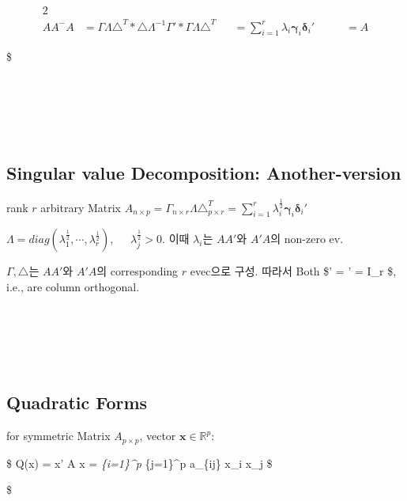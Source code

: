 \documentclass[
]{book}
\begin{document}
{{{\begin{alignat}{2}
\\

AA^- A &= \Gamma \Lambda \triangle^T \ast \triangle \Lambda^{-1}  \Gamma' \ast \Gamma \Lambda \triangle^T 

&&=\sum_{i=1}^r \lambda_i \pmb \gamma_i \pmb \delta_i ' \; \; \; \; \;  \; \; \; \; \; = A




\end{alignat}

\$

~\\
~\\
~\\
~\\

\hypertarget{singular-value-decomposition-another-version}{%
\subsection{Singular value Decomposition: Another-version}\label{singular-value-decomposition-another-version}}

rank \(r\) arbitrary Matrix \(A_{n \times p} = \Gamma_{n \times r} \Lambda \triangle^T_{p \times r} =\sum_{i=1}^r \lambda_i^{\tfrac{1}{2}} \pmb \gamma_i \pmb \delta_i '\)

\(\Lambda = diag(\lambda_1^{\tfrac{1}{2}} , \cdots, \lambda_r^{\tfrac{1}{2}}), \; \; \; \; \; \lambda_j^{\tfrac{1}{2}} >0\). 이때 \(\lambda_i\)는 \(AA'\)와 \(A'A\)의 non-zero ev.

\(\Gamma, \triangle\)는 \(AA'\)와 \(A'A\)의 corresponding \(r\) evec으로 구성. 따라서 Both \$\Gamma ' \Gamma = \triangle ' \triangle  = I\_r \$, i.e., are column orthogonal.

~\\
~\\
~\\
~\\

\hypertarget{quadratic-forms}{%
\subsection{Quadratic Forms}\label{quadratic-forms}}

for symmetric Matrix \(A_{p \times p}\), vector \(\pmb x \in \mathbb{R}^p\):

\$
Q(x) = \pmb x' A \pmb x = \sum\emph{\{i=1\}\^{}p \sum}\{j=1\}\^{}p a\_\{ij\} x\_i x\_j 
\$

\$
\begin{align}


\end{align}}}}
\end{document}

